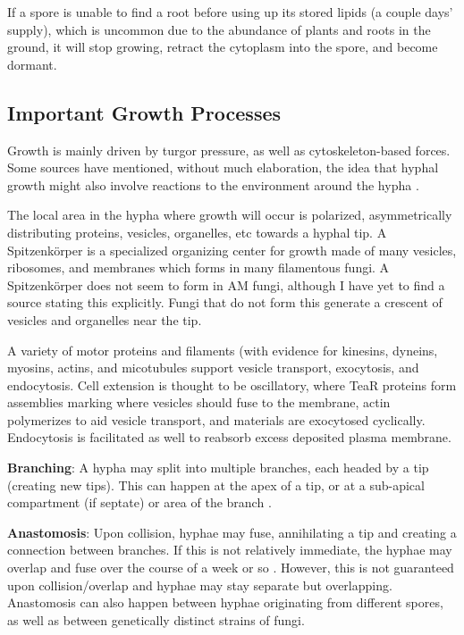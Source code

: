 \documentclass{article}
\begin{document}
If a spore is unable to find a root before using up its stored lipids (a couple days' supply), which is uncommon due to the abundance of plants and roots in the ground, it will stop growing, retract the cytoplasm into the spore, and become dormant. 




\subsection{Important Growth Processes}
Growth is mainly driven by turgor pressure, as well as cytoskeleton-based forces. Some sources have mentioned, without much elaboration, the idea that hyphal growth might also involve reactions to the environment around the hypha \cite{cellBioHyphalGrow}. 

The local area in the hypha where growth will occur is polarized, asymmetrically distributing proteins, vesicles, organelles, etc towards a hyphal tip. A Spitzenk{\"o}rper is a specialized organizing center for growth made of many vesicles, ribosomes, and membranes which forms in many filamentous fungi.  A Spitzenk{\"o}rper does not seem to form in AM fungi, although I have yet to find a source stating this explicitly. Fungi that do not form this generate a crescent of vesicles and organelles near the tip.

A variety of motor proteins and filaments (with evidence for kinesins, dyneins, myosins, actins, and micotubules support vesicle transport, exocytosis, and endocytosis. 
Cell extension is thought to be oscillatory, where TeaR proteins form assemblies marking where vesicles should fuse to the membrane, actin polymerizes to aid vesicle transport, and materials are exocytosed cyclically. Endocytosis is facilitated as well to reabsorb excess deposited plasma membrane. \cite{SPKdiagramArticle}\cite{motorslipidsSPK}

\textbf{Branching}: A hypha may split into multiple branches, each headed by a tip (creating new tips). This can happen at the apex of a tip, or at a sub-apical compartment (if septate) or area of the branch \cite{HARRIS201935}.

\textbf{Anastomosis}: Upon collision, hyphae may fuse, annihilating a tip and creating a connection between branches. If this is not relatively immediate, the hyphae may overlap and fuse over the course of a week or so \cite{Oyarte2025travelling}. However, this is not guaranteed upon collision/overlap and hyphae may stay separate but overlapping. Anastomosis can also happen between hyphae originating from different spores, as well as between genetically distinct strains of fungi.
\end{document}
